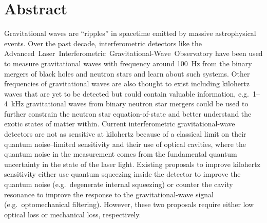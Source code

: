 \chapter*{Abstract}

Gravitational waves are ``ripples'' in spacetime emitted by massive astrophysical events. %
Over the past decade, interferometric detectors like the Advanced~Laser~Interferometric~Gravitational-Wave~Observatory have been used to measure gravitational waves with frequency around 100~Hz from the binary mergers of black holes and neutron stars and learn about such systems.
Other frequencies of gravitational waves are also thought to exist including kilohertz waves that are yet to be detected but could contain valuable information, e.g.\ 1--4~kHz gravitational waves from binary neutron star mergers could be used to further constrain the neutron star equation-of-state and better understand the exotic states of matter within.
Current interferometric gravitational-wave detectors are not as sensitive at kilohertz because of a classical limit on their quantum noise--limited sensitivity and their use of optical cavities, where the quantum noise in the measurement comes from the fundamental quantum uncertainty in the state of the laser light. Existing proposals to improve kilohertz sensitivity either use quantum squeezing inside the detector to improve the quantum noise (e.g.\ degenerate internal squeezing) or counter the cavity resonance to improve the response to the gravitational-wave signal (e.g.\ optomechanical filtering). However, these two proposals require either low optical loss or mechanical loss, respectively.

